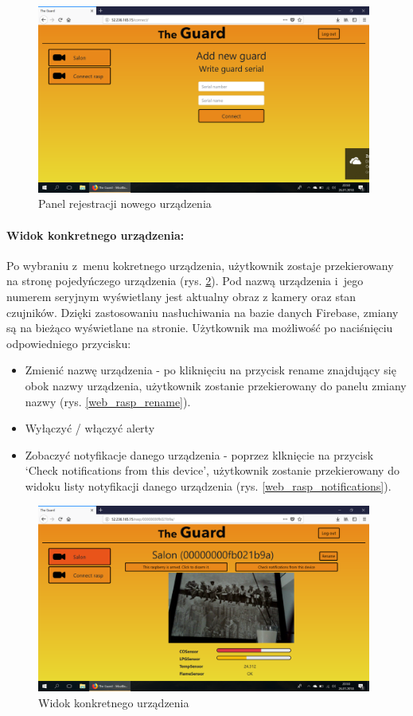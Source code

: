 \begin{figure}[ht]
	\centering
	\includegraphics[width=11cm]{web_screenshots/add_rasp.png}
	\caption{Panel rejestracji nowego urządzenia}
	\label{web_register}
\end{figure}

\paragraph{Widok konkretnego urządzenia:} Po wybraniu z~menu kokretnego urządzenia, użytkownik zostaje przekierowany na stronę pojedyńczego urządzenia (rys. \ref{web_rasp_view}). Pod nazwą urządzenia i~jego numerem seryjnym wyświetlany jest aktualny obraz z kamery oraz stan czujników. Dzięki zastosowaniu nasłuchiwania na bazie danych Firebase, zmiany są na bieżąco wyświetlane na stronie. Użytkownik ma możliwość po naciśnięciu odpowiedniego przycisku:
\begin{itemize}
\item Zmienić nazwę urządzenia - po kliknięciu na przycisk rename znajdujący się obok nazwy urządzenia, użytkownik zostanie przekierowany do panelu zmiany nazwy (rys. \ref{web_rasp_rename}).
\item Wyłączyć / włączyć alerty 
\item Zobaczyć notyfikacje danego urządzenia - poprzez klknięcie na przycisk `Check notifications from this device', użytkownik zostanie przekierowany do widoku listy notyfikacji danego urządzenia (rys. \ref{web_rasp_notifications}).
\end{itemize}

\begin{figure}[ht]
	\centering
	\includegraphics[width=11cm]{web_screenshots/rasp_view.png}
	\caption{Widok konkretnego urządzenia}
	\label{web_rasp_view}
\end{figure}

